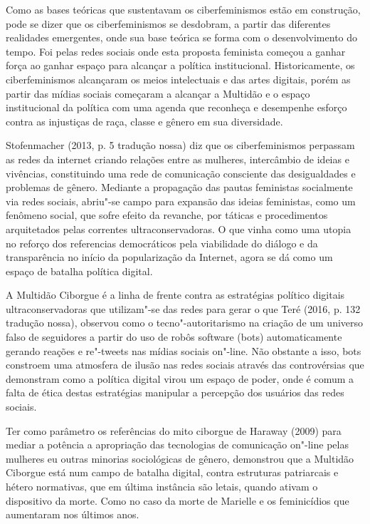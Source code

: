 Como as bases teóricas que sustentavam os ciberfeminismos estão em
construção, pode se dizer que os ciberfeminismos se desdobram, a partir
das diferentes realidades emergentes, onde sua base teórica se forma com
o desenvolvimento do tempo. Foi pelas redes sociais onde esta proposta
feminista começou a ganhar força ao ganhar espaço para alcançar a
política institucional. Historicamente, os ciberfeminismos alcançaram os
meios intelectuais e das artes digitais, porém as partir das mídias
sociais começaram a alcançar a Multidão e o espaço institucional da
política com uma agenda que reconheça e desempenhe esforço contra as
injustiças de raça, classe e gênero em sua diversidade.

Stofenmacher (2013, p. 5 tradução nossa) diz que os ciberfeminismos
perpassam as redes da internet criando relações entre as mulheres,
intercâmbio de ideias e vivências, constituindo uma rede de comunicação
consciente das desigualdades e problemas de gênero. Mediante a
propagação das pautas feministas socialmente via redes sociais, abriu"-se
campo para expansão das ideias feministas, como um fenômeno social, que
sofre efeito da revanche, por táticas e procedimentos arquitetados pelas
correntes ultraconservadoras. O que vinha como uma utopia no reforço dos
referencias democráticos pela viabilidade do diálogo e da transparência
no início da popularização da Internet, agora se dá como um espaço de
batalha política digital.

A Multidão Ciborgue é a linha de frente contra as estratégias político
digitais ultraconservadoras que utilizam"-se das redes para gerar o que
Teré (2016, p. 132 tradução nossa), observou como o tecno"-autoritarismo
na criação de um universo falso de seguidores a partir do uso de robôs
software (bots) automaticamente gerando reações e re"-tweets nas mídias
sociais on"-line. Não obstante a isso, bots constroem uma atmosfera de
ilusão nas redes sociais através das controvérsias que demonstram como a
política digital virou um espaço de poder, onde é comum a falta de ética
destas estratégias manipular a percepção dos usuários das redes sociais.

Ter como parâmetro os referências do mito ciborgue de Haraway (2009)
para mediar a potência a apropriação das tecnologias de comunicação
on"-line pelas mulheres eu outras minorias sociológicas de gênero,
demonstrou que a Multidão Ciborgue está num campo de batalha digital,
contra estruturas patriarcais e hétero normativas, que em última
instância são letais, quando ativam o dispositivo da morte. Como no caso
da morte de Marielle e os feminicídios que aumentaram nos últimos anos.


